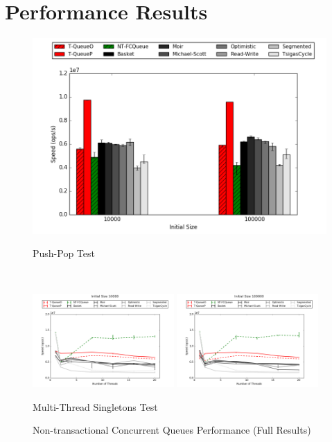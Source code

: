 \section{Performance Results}
\begin{figure}[H]
    \centering
	\begin{minipage}{0.5\textwidth}
    \centering
    \includegraphics[width=\textwidth]{concurrent/allQ:PushPop.png}
    \caption*{Push-Pop Test}
	\end{minipage}\\
    \begin{minipage}{\textwidth}
    \centering
    \includegraphics[width=0.48\textwidth]{concurrent/allQ:RandSingleOps10000.png}
    \includegraphics[width=0.48\textwidth]{concurrent/allQ:RandSingleOps100000.png}
    \caption*{Multi-Thread Singletons Test}
	\end{minipage}
    \caption{Non-transactional Concurrent Queues Performance (Full Results)}
\end{figure}


